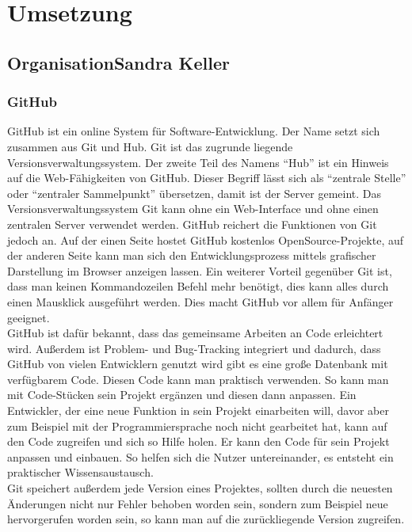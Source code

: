 \chapter{Umsetzung} \label{umsetzung}
	\section[Organisation]{Organisation{\hfill \normalsize Sandra Keller}}
	\subsection{GitHub}
	GitHub ist ein online System für Software-Entwicklung. Der Name setzt sich zusammen aus Git und Hub. Git ist das zugrunde liegende Versionsverwaltungssystem. Der zweite Teil des Namens \enquote{Hub} ist ein Hinweis auf die Web-Fähigkeiten von GitHub. Dieser Begriff lässt sich als \enquote{zentrale Stelle} oder \enquote{zentraler Sammelpunkt} übersetzen, damit ist der Server gemeint. Das Versionsverwaltungssystem Git kann ohne ein Web-Interface und ohne einen zentralen Server verwendet werden. GitHub reichert die Funktionen von Git jedoch an. Auf der einen Seite hostet GitHub kostenlos OpenSource-Projekte, auf der anderen Seite kann man sich den Entwicklungsprozess mittels grafischer Darstellung im Browser anzeigen lassen. Ein weiterer Vorteil gegenüber Git ist, dass man keinen Kommandozeilen Befehl mehr benötigt, dies kann alles durch einen Mausklick ausgeführt werden. Dies macht GitHub vor allem für Anfänger geeignet. 
	\\GitHub ist dafür bekannt, dass das gemeinsame Arbeiten an Code erleichtert wird. Außerdem ist Problem- und Bug-Tracking integriert und dadurch, dass GitHub von vielen Entwicklern genutzt wird gibt es eine große Datenbank mit verfügbarem Code. Diesen Code kann man praktisch verwenden. So kann man mit Code-Stücken sein Projekt ergänzen und diesen dann anpassen. Ein Entwickler, der eine neue Funktion in sein Projekt einarbeiten will, davor aber zum Beispiel mit der Programmiersprache noch nicht gearbeitet hat, kann auf den Code zugreifen und sich so Hilfe holen. Er kann den Code für sein Projekt anpassen und einbauen. So helfen sich die Nutzer untereinander, es entsteht ein praktischer Wissensaustausch.
	\\Git speichert außerdem jede Version eines Projektes, sollten durch die neuesten Änderungen nicht nur Fehler behoben worden sein, sondern zum Beispiel neue hervorgerufen worden sein, so kann man auf die zurückliegende Version zugreifen.
	
